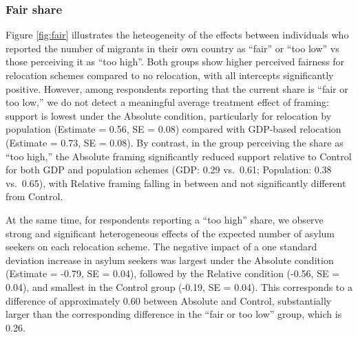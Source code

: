 \documentclass[
  12pt,
  a4paper,
]{article}
\begin{document}
\subsubsection{Fair share}\label{fair-share}

Figure \ref{fig:fair} illustrates the heteogeneity of the effects between individuals who reported the number of migrants in their own country as ``fair'' or ``too low'' vs those perceiving it as ``too high''. Both groups show higher perceived fairness for relocation schemes compared to no relocation, with all intercepts significantly positive. However, among respondents reporting that the current share is ``fair or too low,'' we do not detect a meaningful average treatment effect of framing: support is lowest under the Absolute condition, particularly for relocation by population (Estimate = 0.56, SE = 0.08) compared with GDP-based relocation (Estimate = 0.73, SE = 0.08). By contrast, in the group perceiving the share as ``too high,'' the Absolute framing significantly reduced support relative to Control for both GDP and population schemes (GDP: 0.29 vs.~0.61; Population: 0.38 vs.~0.65), with Relative framing falling in between and not significantly different from Control.

At the same time, for respondents reporting a ``too high'' share, we observe strong and significant heterogeneous effects of the expected number of asylum seekers on each relocation scheme. The negative impact of a one standard deviation increase in asylum seekers was largest under the Absolute condition (Estimate = -0.79, SE = 0.04), followed by the Relative condition (-0.56, SE = 0.04), and smallest in the Control group (-0.19, SE = 0.04). This corresponds to a difference of approximately 0.60 between Absolute and Control, substantially larger than the corresponding difference in the ``fair or too low'' group, which is 0.26.
\end{document}
